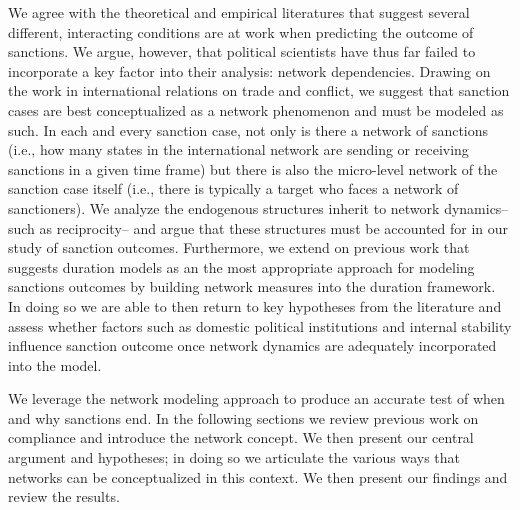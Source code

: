 We agree with the theoretical and empirical literatures that suggest several different, interacting conditions are at work when predicting the outcome of sanctions. We argue, however, that political scientists have thus far failed to incorporate a key factor into their analysis: network dependencies. Drawing on the work in international relations on trade and conflict, we suggest that sanction cases are best conceptualized as a network phenomenon and must be modeled as such. In each and every sanction case, not only is there a network of sanctions (i.e., how many states in the international network are sending or receiving sanctions in a given time frame) but there is also the micro-level network of the sanction case itself (i.e., there is typically a target who faces a network of sanctioners). We analyze the endogenous structures inherit to network dynamics--such as reciprocity-- and argue that these structures must be accounted for in our study of sanction outcomes. Furthermore, we extend on previous work that suggests duration models as an the most appropriate approach for modeling sanctions outcomes by building network measures into the duration framework. In doing so we are able to then return to key hypotheses from the literature and assess whether factors such as domestic political institutions and internal stability influence sanction outcome once network dynamics are adequately incorporated into the model. 

We leverage the network modeling approach to produce an accurate test of when and why sanctions end. In the following sections we review previous work on compliance and introduce the network concept. We then present our central argument and hypotheses; in doing so we articulate the various ways that networks can be conceptualized in this context. We then present our findings and review the results.
